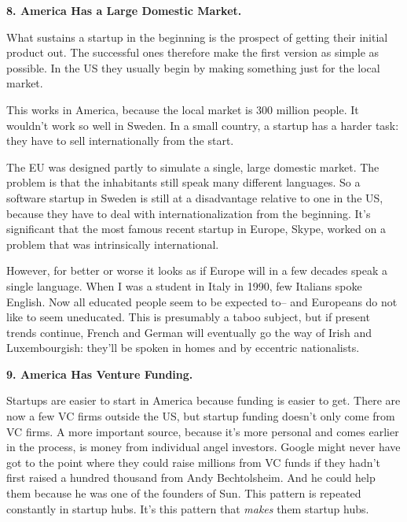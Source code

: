 \textbf{8. America Has a Large Domestic Market.}

What sustains a startup in the beginning is the
                  prospect of getting their initial product out. The successful
                  ones therefore make the first version as simple as possible.
                  In the US they usually begin by making something just for the
                  local market.

This works in America, because the
                  local market is 300 million people. It wouldn't work so well
                  in Sweden. In a small country, a startup has a harder task:
                  they have to sell internationally from the start.

The
                  EU was designed partly to simulate a single, large domestic
                  market. The problem is that the inhabitants still speak many
                  different languages. So a software startup in Sweden is still
                  at a disadvantage relative to one in the US, because they have
                  to deal with internationalization from the beginning. It's
                  significant that the most famous recent startup in Europe,
                  Skype, worked on a problem that was intrinsically
                  international.

However, for better or worse it
                  looks as if Europe will in a few decades speak a single
                  language. When I was a student in Italy in 1990, few Italians
                  spoke English. Now all educated people seem to be expected
                  to-- and Europeans do not like to seem uneducated. This is
                  presumably a taboo subject, but if present trends continue,
                  French and German will eventually go the way of Irish and
                  Luxembourgish: they'll be spoken in homes and by eccentric
                  nationalists.

\textbf{9. America Has Venture Funding.}

Startups are easier to start in America because
                  funding is easier to get. There are now a few VC firms outside
                  the US, but startup funding doesn't only come from VC firms. A
                  more important source, because it's more personal and comes
                  earlier in the process, is money from individual angel
                  investors. Google might never have got to the point where they
                  could raise millions from VC funds if they hadn't first raised
                  a hundred thousand from Andy Bechtolsheim. And he could help
                  them because he was one of the founders of Sun. This pattern
                  is repeated constantly in startup hubs. It's this pattern that
                  \emph{makes} them startup hubs.


